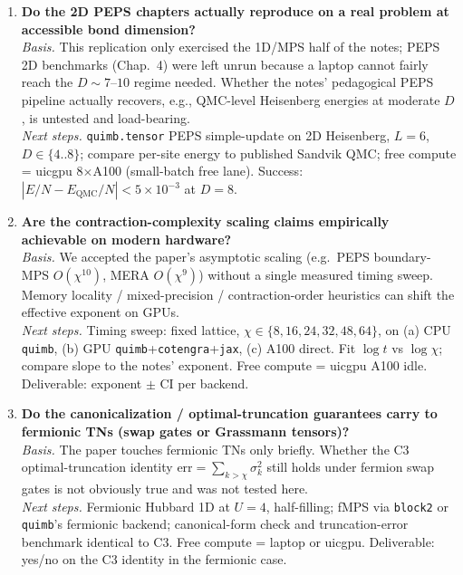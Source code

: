 \begin{enumerate}
  \item \textbf{Do the 2D PEPS chapters actually reproduce on a real problem at accessible bond dimension?}\\
        \emph{Basis.} This replication only exercised the 1D/MPS half of the notes; PEPS 2D benchmarks (Chap.~4) were left unrun because
        a laptop cannot fairly reach the $D\sim 7\text{--}10$ regime needed. Whether the notes' pedagogical PEPS pipeline actually recovers,
        e.g., QMC-level Heisenberg energies at moderate $D$, is untested and load-bearing.\\
        \emph{Next steps.} \texttt{quimb.tensor} PEPS simple-update on 2D Heisenberg, $L{=}6$, $D\in\{4..8\}$; compare per-site energy to
        published Sandvik QMC; free compute = uicgpu 8$\times$A100 (small-batch free lane). Success: $|E/N - E_\text{QMC}/N| < 5\times 10^{-3}$ at $D{=}8$.

  \item \textbf{Are the contraction-complexity scaling claims empirically achievable on modern hardware?}\\
        \emph{Basis.} We accepted the paper's asymptotic scaling (e.g.\ PEPS boundary-MPS $O(\chi^{10})$, MERA $O(\chi^9)$) without a single
        measured timing sweep. Memory locality / mixed-precision / contraction-order heuristics can shift the effective exponent on GPUs.\\
        \emph{Next steps.} Timing sweep: fixed lattice, $\chi\in\{8,16,24,32,48,64\}$, on (a) CPU \texttt{quimb}, (b) GPU
        \texttt{quimb}+\texttt{cotengra}+\texttt{jax}, (c) A100 direct. Fit $\log t$ vs $\log \chi$; compare slope to the notes' exponent.
        Free compute = uicgpu A100 idle. Deliverable: exponent $\pm$ CI per backend.

  \item \textbf{Do the canonicalization / optimal-truncation guarantees carry to fermionic TNs (swap gates or Grassmann tensors)?}\\
        \emph{Basis.} The paper touches fermionic TNs only briefly. Whether the C3 optimal-truncation identity
        $\text{err} = \sum_{k>\chi}\sigma_k^2$ still holds under fermion swap gates is not obviously true and was not tested here.\\
        \emph{Next steps.} Fermionic Hubbard 1D at $U{=}4$, half-filling; fMPS via \texttt{block2} or \texttt{quimb}'s fermionic backend;
        canonical-form check and truncation-error benchmark identical to C3. Free compute = laptop or uicgpu. Deliverable: yes/no on the C3 identity in the fermionic case.


\end{enumerate}
